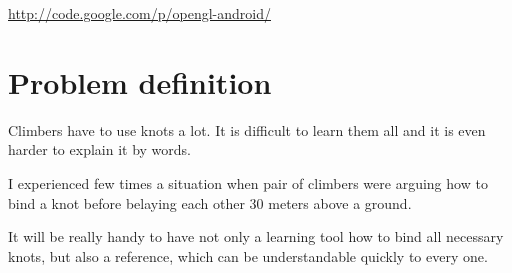 \label{cha:Opengl-Android application}
\url{http://code.google.com/p/opengl-android/}

\section*{Problem definition} %
\label{sec:Problem definition}
Climbers have to use knots a lot. It is difficult to learn them all
and it is even harder to explain it by words.

I experienced few times a situation when pair of climbers
were arguing how to bind a knot before belaying each other
30 meters above a ground.

It will be really handy to have not only a learning tool
how to bind all necessary knots, but also a reference, 
which can be understandable quickly to every one.

